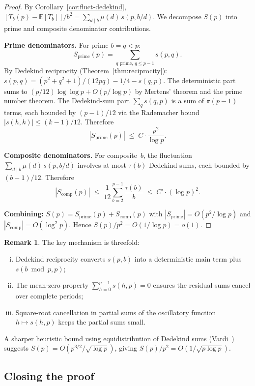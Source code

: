 \documentclass[11pt]{article}
\theoremstyle{definition}
\newtheorem{remark}[theorem]{Remark}
\begin{document}
\begin{proof}
By Corollary~\ref{cor:fluct-dedekind},
$[T_b(p) - \mathbb{E}[T_b]]/b^2 = \sum_{d \mid b} \mu(d)\,s(p,b/d)$.
We decompose $S(p)$ into prime and composite denominator contributions.

\smallskip
\noindent\textbf{Prime denominators.}
For prime $b = q < p$:
\[
  S_{\mathrm{prime}}(p) = \sum_{q \text{ prime}, \, q \le p-1} s(p, q).
\]
By Dedekind reciprocity (Theorem~\ref{thm:reciprocity}):
$s(p,q) = (p^2 + q^2 + 1)/(12pq) - 1/4 - s(q,p)$.
The deterministic part sums to $(p/12)\log\log p + O(p/\log p)$
by Mertens' theorem and the prime number theorem.  The Dedekind-sum
part $\sum_q s(q,p)$ is a sum of $\pi(p-1)$ terms, each bounded by
$(p-1)/12$ via the Rademacher bound $|s(h,k)| \le (k-1)/12$.
Therefore
\[
  |S_{\mathrm{prime}}(p)| \;\le\; C \cdot \frac{p^2}{\log p}.
\]

\smallskip
\noindent\textbf{Composite denominators.}
For composite~$b$, the fluctuation
$\sum_{d \mid b} \mu(d)\,s(p,b/d)$ involves at most $\tau(b)$
Dedekind sums, each bounded by $(b-1)/12$.  Therefore
\[
  |S_{\mathrm{comp}}(p)| \;\le\; \frac{1}{12}\sum_{b=2}^{p-1}
    \frac{\tau(b)}{b} \;\le\; C' \cdot (\log p)^2.
\]

\smallskip
\noindent\textbf{Combining:}
$S(p) = S_{\mathrm{prime}}(p) + S_{\mathrm{comp}}(p)$ with
$|S_{\mathrm{prime}}| = O(p^2/\log p)$ and
$|S_{\mathrm{comp}}| = O(\log^2 p)$.  Hence
$S(p)/p^2 = O(1/\log p) = o(1)$.
\end{proof}

\begin{remark}
The key mechanism is threefold:
\begin{enumerate}[(i)]
  \item Dedekind reciprocity converts $s(p,b)$ into a deterministic
    main term plus $s(b \bmod p, p)$;
  \item The mean-zero property $\sum_{h=0}^{p-1} s(h,p) = 0$
    ensures the residual sums cancel over complete periods;
  \item Square-root cancellation in partial sums of the oscillatory
    function $h \mapsto s(h,p)$ keeps the partial sums small.
\end{enumerate}
A sharper heuristic bound using equidistribution of Dedekind sums
(Vardi~\cite{Vardi1987}) suggests $S(p) = O(p^{3/2}/\sqrt{\log p})$,
giving $S(p)/p^2 = O(1/\sqrt{p \log p})$.
\end{remark}

\subsection{Closing the proof}\label{sec:sign-close}
\end{document}
